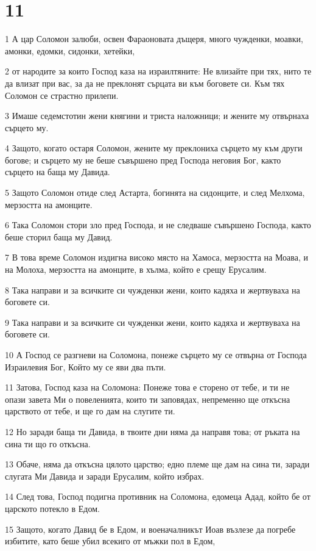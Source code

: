 \chapter{11}

\par 1 А цар Соломон залюби, освен Фараоновата дъщеря, много чужденки, моавки, амонки, едомки, сидонки, хетейки,
\par 2 от народите за които Господ каза на израилтяните: Не влизайте при тях, нито те да влизат при вас, за да не преклонят сърцата ви към боговете си. Към тях Соломон се страстно прилепи.
\par 3 Имаше седемстотин жени княгини и триста наложници; и жените му отвърнаха сърцето му.
\par 4 Защото, когато остаря Соломон, жените му преклониха сърцето му към други богове; и сърцето му не беше съвършено пред Господа неговия Бог, както сърцето на баща му Давида.
\par 5 Защото Соломон отиде след Астарта, богинята на сидонците, и след Мелхома, мерзостта на амонците.
\par 6 Така Соломон стори зло пред Господа, и не следваше съвършено Господа, както беше сторил баща му Давид.
\par 7 В това време Соломон издигна високо място на Хамоса, мерзостта на Моава, и на Молоха, мерзостта на амонците, в хълма, който е срещу Ерусалим.
\par 8 Така направи и за всичките си чужденки жени, които кадяха и жертвуваха на боговете си.
\par 9 Така направи и за всичките си чужденки жени, които кадяха и жертвуваха на боговете си.
\par 10 А Господ се разгневи на Соломона, понеже сърцето му се отвърна от Господа Израилевия Бог, Който му се яви два пъти.
\par 11 Затова, Господ каза на Соломона: Понеже това е сторено от тебе, и ти не опази завета Ми о повеленията, които ти заповядах, непременно ще откъсна царството от тебе, и ще го дам на слугите ти.
\par 12 Но заради баща ти Давида, в твоите дни няма да направя това; от ръката на сина ти що го откъсна.
\par 13 Обаче, няма да откъсна цялото царство; едно племе ще дам на сина ти, заради слугата Ми Давида и заради Ерусалим, който избрах.
\par 14 След това, Господ подигна противник на Соломона, едомеца Адад, който бе от царското потекло в Едом.
\par 15 Защото, когато Давид бе в Едом, и военачалникът Иоав възлезе да погребе избитите, като беше убил всекиго от мъжки пол в Едом,
